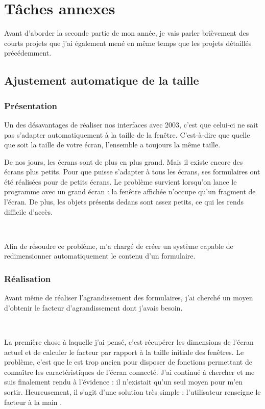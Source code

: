 \chapter{Tâches annexes}
Avant d'aborder la seconde partie de mon année, je vais parler brièvement des courts projets que j'ai également mené en même temps que les projets détaillés précédemment.

\section{Ajustement automatique de la taille}
\subsection{Présentation}
Un des désavantages de réaliser nos interfaces avec  2003, c'est que celui-ci ne sait pas s'adapter automatiquement à la taille de la fenêtre. C'est-à-dire que quelle que soit la taille de votre écran, l'ensemble a toujours la même taille.

De nos jours, les écrans sont de plus en plus grand. Mais il existe encore des écrans plus petits. Pour que \integrale{} puisse s'adapter à tous les écrans, ses formulaires ont été réalisées pour de petits écrans. Le problème survient lorsqu'on lance le programme avec un grand écran : la fenêtre affichée n'occupe qu'un fragment de l'écran. De plus, les objets présents dedans sont assez petits, ce qui les rends difficile d'accès.

~

Afin de résoudre ce problème, \solulog{} m'a chargé de créer un système capable de redimensionner automatiquement le contenu d'un formulaire.

\subsection{Réalisation}
Avant même de réaliser l'agrandissement des formulaires, j'ai cherché un moyen d'obtenir le facteur d'agrandissement dont j'avais besoin.

~

La première chose à laquelle j'ai pensé, c'est récupérer les dimensions de l'écran actuel et de calculer le facteur par rapport à la taille initiale des fenêtres. Le problème, c'est que le \vb{} est trop ancien pour disposer de fonctions permettant de connaître les caractéristiques de l'écran connecté. J'ai continué à chercher et me suis finalement rendu à l'évidence : il n'existait qu'un seul moyen pour m'en sortir. Heureusement, il s'agit d'une solution très simple : l'utilisateur renseigne le facteur \og à la main \fg.

